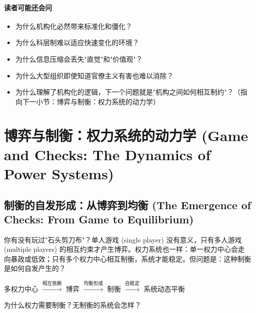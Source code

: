 \documentclass[../main.tex]{subfiles}
\begin{document}
	\paragraph*{读者可能还会问}
	\begin{itemize}

	\item 为什么机构化必然带来标准化和僵化？

	\item 为什么科层制难以适应快速变化的环境？

	\item 为什么信息压缩会丢失"直觉"和"价值观"？

	\item 为什么大型组织即使知道官僚主义有害也难以消除？

	\item 为什么理解了机构化的逻辑，下一个问题就是"机构之间如何相互制约"？（指向下一小节：博弈与制衡：权力系统的动力学）
	\end{itemize}
	
	\section{博弈与制衡：权力系统的动力学 (Game and Checks: The Dynamics of Power Systems)}
	
	\subsection{制衡的自发形成：从博弈到均衡 (The Emergence of Checks: From Game to Equilibrium)}
	
	\begin{motivation}

		你有没有玩过"石头剪刀布"？单人游戏 (single player) 没有意义，只有多人游戏 (multiple players) 的相互约束才产生博弈。权力系统也一样：单一权力中心会走向暴政或低效；只有多个权力中心相互制衡，系统才能稳定。但问题是：这种制衡是如何自发产生的？

	\end{motivation}
	
	\begin{logicmap}

		多权力中心 $\xrightarrow{\text{相互依赖}}$ 博弈 $\xrightarrow{\text{均衡形成}}$ 制衡 $\xrightarrow{\text{自稳定}}$ 系统动态平衡

	\end{logicmap}
	
	\begin{questionbox}

		为什么权力需要制衡？无制衡的系统会怎样？

	\end{questionbox}
	
\end{document}
